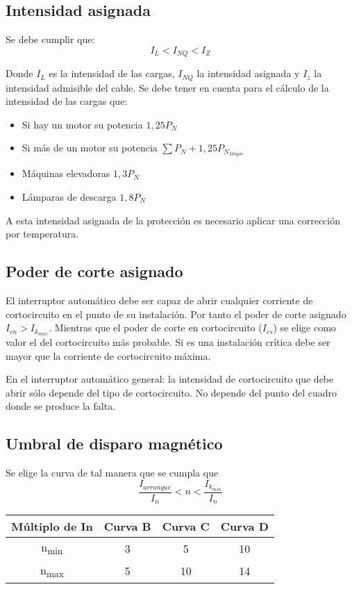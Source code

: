 \subsection{Intensidad asignada}
Se debe cumplir que:
\begin{equation}
	I_L < I_{NQ} < I_Z
\end{equation}

Donde $I_L$ es la intensidad de las cargas, $I_{NQ}$ la intensidad asignada y $I_z$ la intensidad admisible del cable. Se debe tener en cuenta para el cálculo de la intensidad de las cargas que:
\begin{itemize}
	\item Si hay un motor su potencia $1,25P_N$
	\item Si más de un motor su potencia $\sum P_N+1,25P_{N_{Mayor}}$
	\item Máquinas elevadoras $1,3P_N$
	\item Lámparas de descarga $1,8P_N$
\end{itemize}

A esta intensidad asignada de la protección es necesario aplicar una corrección por temperatura.
\subsection{Poder de corte asignado}
El interruptor automático debe ser capaz de abrir cualquier corriente de cortocircuito en el punto de su instalación. Por tanto el poder de corte asignado $I_{cn}>I_{k_{max}}$. Mientras que el poder de corte en cortocircuito ($I_{cs}$) se elige como valor el del cortocircuito más probable. Si es una instalación crítica debe ser mayor que la corriente de cortocircuito máxima.
\newline

En el interruptor automático general: la intensidad de cortocircuito que debe abrir sólo depende del tipo de cortocircuito. No depende del punto del cuadro donde se produce la falta.
\subsection{Umbral de disparo magnético}
Se elige la curva de tal manera que se cumpla que 
\begin{equation}
	\dfrac{I_{arranque}}{I_n}< n < \dfrac{I_{k_{min}}}{I_n}
\end{equation}
\begin{table}[H]
	\centering
	\begin{tabular}{|c|c|c|c|}
		\hline
		\textbf{Múltiplo de In} & \textbf{Curva B} & \textbf{Curva C} & \textbf{Curva D} \\ \hline
		n\textsubscript{min} & 3 & 5 & 10 \\ \hline
		n\textsubscript{max} & 5 & 10 & 14 \\ \hline
	\end{tabular}
\end{table}




